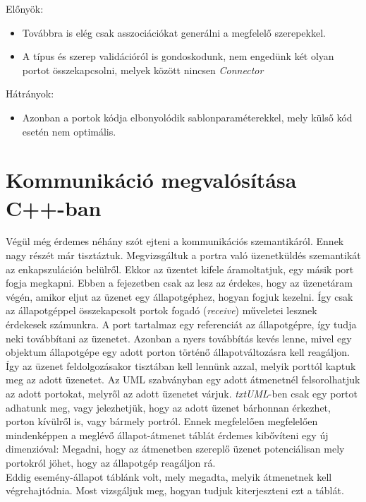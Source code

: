 \documentclass[a4paper,12pt]{report}
\begin{document}
\begin{enumerate}
Előnyök:
\begin{itemize}
\item Továbbra is elég csak asszociációkat generálni a megfelelő szerepekkel.
\item A típus és szerep validációról is gondoskodunk, nem engedünk két olyan portot összekapcsolni, melyek között nincsen \textit{Connector}
\end{itemize}
Hátrányok:
\begin{itemize}
\item Azonban a portok kódja elbonyolódik sablonparaméterekkel, mely külső kód esetén nem optimális.
\end{itemize}
\end{enumerate}

\section{Kommunikáció megvalósítása C++-ban}
Végül még érdemes néhány szót ejteni a kommunikációs szemantikáról. Ennek nagy részét már tisztáztuk. Megvizsgáltuk a portra való üzenetküldés szemantikát az enkapszuláción belülről. Ekkor az üzentet kifele áramoltatjuk, egy másik port fogja megkapni. Ebben a fejezetben csak az lesz az érdekes, hogy az üzenetáram végén, amikor eljut az üzenet egy állapotgéphez, hogyan fogjuk kezelni. Így csak az állapotgéppel összekapcsolt portok fogadó (\textit{receive}) műveletei lesznek érdekesek számunkra. A port tartalmaz egy referenciát az állapotgépre, így tudja neki továbbítani az üzenetet. Azonban a nyers továbbítás kevés lenne, mivel egy objektum állapotgépe egy adott porton történő állapotváltozásra kell reagáljon. Így az üzenet feldolgozásakor tisztában kell lennünk azzal, melyik porttól kaptuk meg az adott üzenetet. Az UML szabványban egy adott átmenetnél felsorolhatjuk az adott portokat, melyről az adott üzenetet várjuk. \textit{txtUML}-ben csak egy portot adhatunk meg, vagy jelezhetjük, hogy az adott üzenet bárhonnan érkezhet, porton kívülről is, vagy bármely portról. Ennek megfelelően megfelelően mindenképpen a meglévő állapot-átmenet táblát érdemes kibővíteni egy új dimenzióval: Megadni, hogy az átmenetben szereplő üzenet potenciálisan mely portokról jöhet, hogy az állapotgép reagáljon rá. \\
Eddig esemény-állapot táblánk volt, mely megadta, melyik átmenetnek kell végrehajtódnia. \cite{hack_dip} Most vizsgáljuk meg, hogyan tudjuk kiterjeszteni ezt a táblát.
\end{document}
